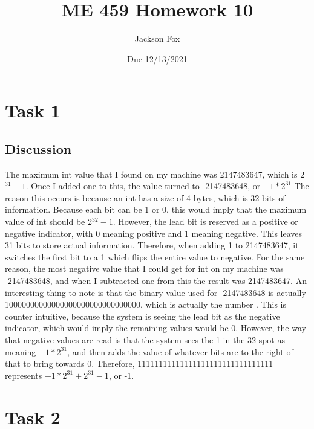 \documentclass[11pt, oneside]{article}   	%
\title{ME 459 Homework 10}
\author{Jackson Fox}
\date{Due 12/13/2021}							%
\begin{document}
\maketitle
\section*{Task 1}
\subsection*{Discussion}
The maximum int value that I found on my machine was 2147483647, which is 2$^{31} - 1$.  Once I added one to this, the value turned to -2147483648, or $-1 * 2^{31}$  The reason this occurs is because an int has a size of 4 bytes, which is 32 bits of information.  Because each bit can be 1 or 0, this would imply that the maximum value of int should be 2$^{32} - 1$. However, the lead bit is reserved as a positive or negative indicator, with 0 meaning positive and 1 meaning negative.  This leaves 31 bits to store actual information.  Therefore, when adding 1 to 2147483647, it switches the first bit to a 1 which flips the entire value to negative.  For the same reason, the most negative value that I could get for int on my machine was -2147483648, and when I subtracted one from this the result was 2147483647.  An interesting thing to note is that the binary value used for -2147483648 is actually 10000000000000000000000000000000, which is actually the number . This is counter intuitive, because the system is seeing the lead bit as the negative indicator, which would imply the remaining values would be 0.  However, the way that negative values are read is that the system sees the 1 in the 32 spot as meaning $-1 * 2^{31}$, and then adds the value of whatever bits are to the right of that to bring towards 0.  Therefore, 11111111111111111111111111111111 represents $-1 * 2^{31} + 2^{31} - 1$, or -1.

\section*{Task 2}
\end{document}
